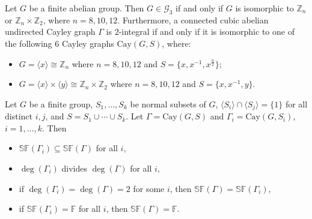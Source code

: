 \documentclass[10pt,a4paper]{amsart}
\begin{document}
	\begin{thm}\label{3}
		Let $G$ be a finite abelian group. Then $G\in\mathcal{G}_3$ if and only if $G$ is isomorphic to $\mathbb Z_n$ or $\mathbb Z_n\times\mathbb Z_2$, where $n=8,10,12$.
		Furthermore, a connected cubic abelian undirected Cayley graph $\Gamma$ is $2$-integral if and only if it is isomorphic to one of the  following $6$ Cayley graphs $\mathrm{Cay}(G,S)$, where:
		\begin{itemize}
			\item[$\romannumeral1$.] $G=\langle x\rangle \cong \mathbb{Z}_n$ where $n=8,10,12$ and $S=\{x,x^{-1},x^{\frac{n}{2}}\}$;
			\item[$\romannumeral2$.] $G=\langle x\rangle \times \langle y\rangle\cong \mathbb{Z}_n\times \mathbb{Z}_2$ where $n=8,10,12$ and $S=\{x,x^{-1},y\}$.
		\end{itemize}
	\end{thm}

	\begin{lem}\label{induced}
		Let $G$ be a finite group, $S_1,\ldots,S_k$ be normal subsets of $G$, $\langle S_i\rangle\cap\langle S_j\rangle=\{1\}$ for all distinct $i,j$, and $S=S_1\cup\cdots\cup S_k$. Let $\Gamma=\mathrm{Cay}(G,S)$ and  $\Gamma_i=\mathrm{Cay}(G,S_i)$, $i=1,\ldots,k$. Then
		\begin{itemize}
			\item[$(1)$] $\mathbb{SF}(\Gamma_i)\subseteq\mathbb{SF}(\Gamma)$ for all $i$,
			\item[$(2)$] $\deg(\Gamma_i)$ divides $\deg(\Gamma)$ for all $i$,
			\item[$(3)$] if $\deg(\Gamma_i)=\deg(\Gamma)=2$ for some $i$, then $\mathbb{SF}(\Gamma)=\mathbb{SF}(\Gamma_i)$,
			\item[$(4)$] if $\mathbb{SF}(\Gamma_i)=\mathbb{F}$ for all $i$, then $\mathbb{SF}(\Gamma)=\mathbb{F}$.
		\end{itemize}
	\end{lem}
\end{document}

